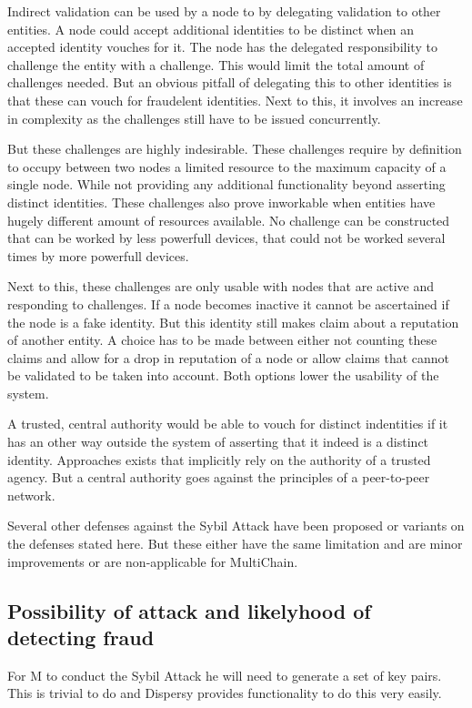 Indirect validation can be used by a node to by delegating validation to other entities.
A node could accept additional identities to be distinct when an accepted identity vouches for it.
The node has the delegated responsibility to challenge the entity with a challenge.
This would limit the total amount of challenges needed.
But an obvious pitfall of delegating this to other identities is that these can vouch for fraudelent identities.
Next to this, it involves an increase in complexity as the challenges still have to be issued concurrently.

But these challenges are highly indesirable.
These challenges require by definition to occupy between two nodes a limited resource to the maximum capacity of a single node.
While not providing any additional functionality beyond asserting distinct identities.
These challenges also prove inworkable when entities have hugely different amount of resources available.
No challenge can be constructed that can be worked by less powerfull devices,
that could not be worked several times by more powerfull devices.

Next to this, these challenges are only usable with nodes that are active and responding to challenges.
If a node becomes inactive it cannot be ascertained if the node is a fake identity.
But this identity still makes claim about a reputation of another entity.
A choice has to be made between either not counting these claims and allow for a drop in reputation of a node or
allow claims that cannot be validated to be taken into account.
Both options lower the usability of the system.

A trusted, central authority would be able to vouch for distinct indentities
if it has an other way outside the system of asserting that it indeed is a distinct identity.
Approaches exists that implicitly rely on the authority of a trusted agency.
But a central authority goes against the principles of a peer-to-peer network.

Several other defenses against the Sybil Attack have been proposed\cite{newsome-sybil}\cite{dinger-sybil}
or variants on the defenses stated here\cite{levine-sybilsurvey}.
But these either have the same limitation and are minor improvements or are non-applicable for MultiChain.

\subsection{Possibility of attack and likelyhood of detecting fraud}
For M to conduct the Sybil Attack he will need to generate a set of key pairs.
This is trivial to do and Dispersy provides functionality to do this very easily.

